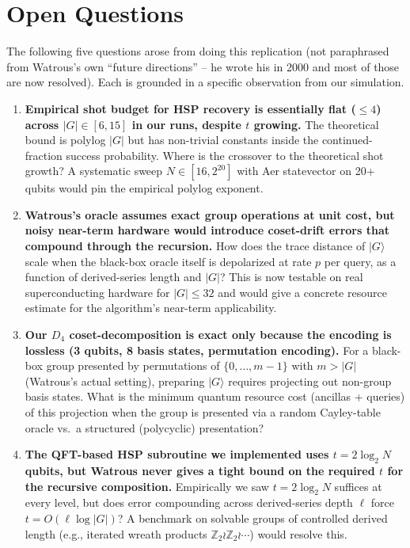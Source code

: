 \section*{Open Questions}

The following five questions arose from doing this replication (not paraphrased from
Watrous's own ``future directions'' -- he wrote his in 2000 and most of those are now
resolved). Each is grounded in a specific observation from our simulation.

\begin{enumerate}
\item[Q1.] \textbf{Empirical shot budget for HSP recovery is essentially flat ($\le 4$) across
$|G|\in[6,15]$ in our runs, despite $t$ growing.} The theoretical bound is polylog $|G|$
but has non-trivial constants inside the continued-fraction success probability. Where is
the crossover to the theoretical shot growth? A systematic sweep $N\in[16, 2^{20}]$ with
Aer statevector on 20+ qubits would pin the empirical polylog exponent.

\item[Q2.] \textbf{Watrous's oracle assumes exact group operations at unit cost, but
noisy near-term hardware would introduce coset-drift errors that compound through the
recursion.} How does the trace distance of $|G\rangle$ scale when the black-box oracle
itself is depolarized at rate $p$ per query, as a function of derived-series length and
$|G|$? This is now testable on real superconducting hardware for $|G|\le 32$ and would
give a concrete resource estimate for the algorithm's near-term applicability.

\item[Q3.] \textbf{Our $D_4$ coset-decomposition is exact only because the encoding is
lossless (3 qubits, 8 basis states, permutation encoding).} For a black-box group presented
by permutations of $\{0,\ldots,m-1\}$ with $m > |G|$ (Watrous's actual setting), preparing
$|G\rangle$ requires projecting out non-group basis states. What is the minimum quantum
resource cost (ancillas + queries) of this projection when the group is presented via a
random Cayley-table oracle vs.\ a structured (polycyclic) presentation?

\item[Q4.] \textbf{The QFT-based HSP subroutine we implemented uses $t = 2\log_2 N$
qubits, but Watrous never gives a tight bound on the required $t$ for the recursive
composition.} Empirically we saw $t = 2\log_2 N$ suffices at every level, but does
error compounding across derived-series depth $\ell$ force $t = O(\ell \log|G|)$?
A benchmark on solvable groups of controlled derived length (e.g., iterated wreath
products $\mathbb{Z}_2 \wr \mathbb{Z}_2 \wr \cdots$) would resolve this.


\end{enumerate}
